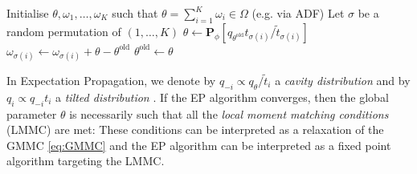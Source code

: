 \begin{algorithm}[!h]\small
	\caption{\label{alg:ep}}
	\begin{algorithmic}[1]
	\State Initialise $\theta,\omega_{1},\dots,\omega_{K}$ such that $\theta=\sum_{i=1}^{K}\omega_{i} \in \Omega$ (e.g. via ADF)
		\State Let $\sigma$ be a random permutation of $(1,\dots,K)$
    		\State $\theta \leftarrow \mathbf P_{\phi}[q_{\theta^{\text{old}}}t_{\sigma(i)}/\tilde t_{\sigma(i)}]$
    		\State $\omega_{\sigma(i)} \leftarrow \omega_{\sigma(i)} + \theta-\theta^{\text{old}}$
			\State $\theta^{\text{old}} \leftarrow \theta$
		\EndFor
	\EndFor\\	
	\Return{$\theta$}
	\end{algorithmic}
\end{algorithm} 

In Expectation Propagation, we denote by $q_{-i}\propto q_{\theta}/\tilde t_{i}$ a \emph{cavity distribution} and by $q_{i}\propto q_{-i}t_{i}$ a \emph{tilted distribution} \cite{gelman14}. If the EP algorithm converges, then the global parameter $\theta$ is necessarily such that all the \emph{local moment matching conditions} (LMMC) are met:
%
%
These conditions can be interpreted as a relaxation of the GMMC \eqref{eq:GMMC} and the EP algorithm can be interpreted as a fixed point algorithm targeting the LMMC.
